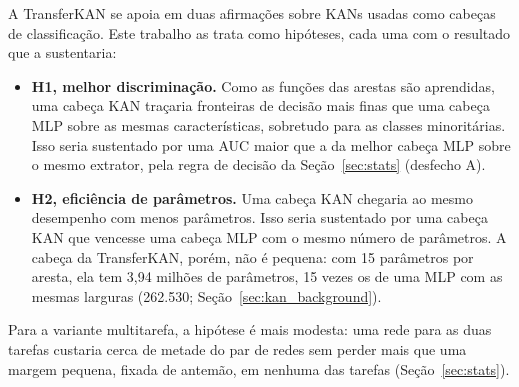 A TransferKAN se apoia em duas afirmações sobre KANs usadas como cabeças de classificação. Este trabalho as trata como hipóteses, cada uma com o resultado que a sustentaria:
\begin{itemize}
    \item \textbf{H1, melhor discriminação.} Como as funções das arestas são aprendidas, uma cabeça KAN traçaria fronteiras de decisão mais finas que uma cabeça MLP sobre as mesmas características, sobretudo para as classes minoritárias. Isso seria sustentado por uma AUC maior que a da melhor cabeça MLP sobre o mesmo extrator, pela regra de decisão da Seção~\ref{sec:stats} (desfecho A).
    \item \textbf{H2, eficiência de parâmetros.} Uma cabeça KAN chegaria ao mesmo desempenho com menos parâmetros. Isso seria sustentado por uma cabeça KAN que vencesse uma cabeça MLP com o mesmo número de parâmetros. A cabeça da TransferKAN, porém, não é pequena: com 15 parâmetros por aresta, ela tem 3,94 milhões de parâmetros, 15 vezes os de uma MLP com as mesmas larguras (262.530; Seção~\ref{sec:kan_background}).
\end{itemize}
Para a variante multitarefa, a hipótese é mais modesta: uma rede para as duas tarefas custaria cerca de metade do par de redes sem perder mais que uma margem pequena, fixada de antemão, em nenhuma das tarefas (Seção~\ref{sec:stats}).
